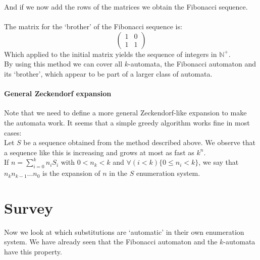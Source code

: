 \documentclass{article}
\begin{document}
And if we now add the rows of the matrices we obtain the Fibonacci sequence.\\
\\
The matrix for the `brother' of the Fibonacci sequence is:
\begin{displaymath} \left( \begin{array}{cc}
1 & 0\\
1 & 1
\end{array} \right) \end{displaymath}
Which applied to the initial matrix yields the sequence of integers in $\mathbb{N}^+$.\\
By using this method we can cover all $k$-automata, the Fibonacci automaton and
its `brother', which appear to be part of a larger class of automata.

\paragraph{General Zeckendorf expansion}
Note that we need to define a more general Zeckendorf-like expansion to make
the automata work. It seems that a simple greedy algorithm works fine in most
cases:\\
Let $S$ be a sequence obtained from the method described above. We observe
that a sequence like this is increasing and grows at most as fast as $k^n$.\\
If $n = \sum_{i = 0}^k n_i S_i$ with $0 < n_k < k$ and 
$\forall (i < k) \{0 \le n_i < k\}$, we say that 
$n_k n_{k - 1} ... n_0$ is the expansion of $n$ in the $S$ enumeration system.

\section*{Survey}
Now we look at which substitutions are `automatic' in their own enumeration
system. We have already seen that the Fibonacci automaton and the $k$-automata
have this property.
\end{document}
